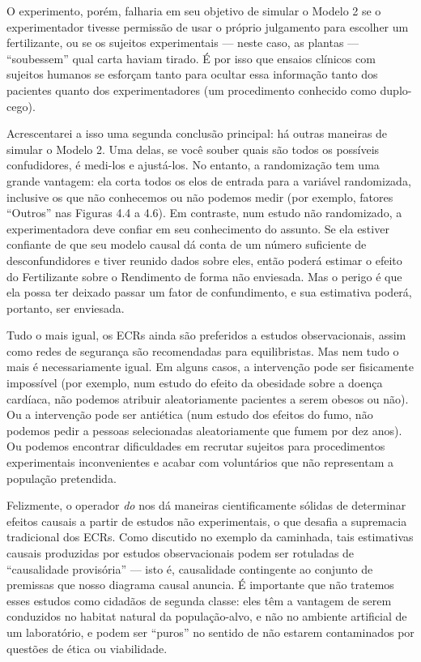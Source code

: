 \documentclass[11pt,a5paper,twoside]{book}
\begin{document}
O experimento, porém, falharia em seu objetivo de simular o Modelo 2 se o experimentador tivesse permissão de usar o próprio julgamento para escolher um fertilizante, ou se os sujeitos experimentais — neste caso, as plantas — “soubessem” qual carta haviam tirado. É por isso que ensaios clínicos com sujeitos humanos se esforçam tanto para ocultar essa informação tanto dos pacientes quanto dos experimentadores (um procedimento conhecido como duplo-cego).

Acrescentarei a isso uma segunda conclusão principal: há outras maneiras de simular o Modelo 2. Uma delas, se você souber quais são todos os possíveis confudidores, é medi-los e ajustá-los. No entanto, a randomização tem uma grande vantagem: ela corta todos os elos de entrada para a variável randomizada, inclusive os que não conhecemos ou não podemos medir (por exemplo, fatores “Outros” nas Figuras 4.4 a 4.6). Em contraste, num estudo não randomizado, a experimentadora deve confiar em seu conhecimento do assunto. Se ela estiver confiante de que seu modelo causal dá conta de um número suficiente de desconfundidores e tiver reunido dados sobre eles, então poderá estimar o efeito do Fertilizante sobre o Rendimento de forma não enviesada. Mas o perigo é que ela possa ter deixado passar um fator de confundimento, e sua estimativa poderá, portanto, ser enviesada.

Tudo o mais igual, os ECRs ainda são preferidos a estudos observacionais, assim como redes de segurança são recomendadas para equilibristas. Mas nem tudo o mais é necessariamente igual. Em alguns casos, a intervenção pode ser fisicamente impossível (por exemplo, num estudo do efeito da obesidade sobre a doença cardíaca, não podemos atribuir aleatoriamente pacientes a serem obesos ou não). Ou a intervenção pode ser antiética (num estudo dos efeitos do fumo, não podemos pedir a pessoas selecionadas aleatoriamente que fumem por dez anos). Ou podemos encontrar dificuldades em recrutar sujeitos para procedimentos experimentais inconvenientes e acabar com voluntários que não representam a população pretendida.

Felizmente, o operador \textit{do} nos dá maneiras cientificamente sólidas de determinar efeitos causais a partir de estudos não experimentais, o que desafia a supremacia tradicional dos ECRs. Como discutido no exemplo da caminhada, tais estimativas causais produzidas por estudos observacionais podem ser rotuladas de “causalidade provisória” — isto é, causalidade contingente ao conjunto de premissas que nosso diagrama causal anuncia. É importante que não tratemos esses estudos como cidadãos de segunda classe: eles têm a vantagem de serem conduzidos no habitat natural da população-alvo, e não no ambiente artificial de um laboratório, e podem ser “puros” no sentido de não estarem contaminados por questões de ética ou viabilidade.
\end{document}
